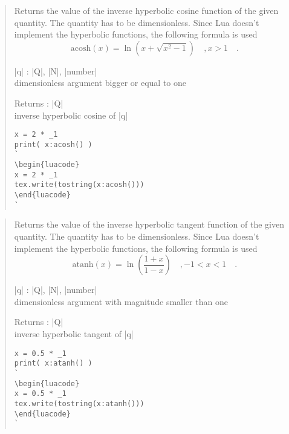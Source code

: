 \documentclass{ltxdoc}
\begin{document}
\begin{quote}
  Returns the value of the inverse hyperbolic cosine function of the given quantity. The quantity has to be dimensionless. Since Lua doesn't implement the hyperbolic functions, the following formula is used 
  $$
    \text{acosh}(x) = \ln\left( x + \sqrt{x^2 - 1} \right)  \quad, x > 1 \quad.
  $$

  \begin{description}
  \item |q| : |Q|, |N|, |number|\\
    dimensionless argument bigger or equal to one

  \item Returns : |Q|\\
    inverse hyperbolic cosine of |q|
  \end{description}


\begin{lstlisting}
x = 2 * _1
print( x:acosh() )
`
\begin{luacode}
x = 2 * _1
tex.write(tostring(x:acosh()))
\end{luacode}
`
\end{lstlisting}

\end{quote}



\begin{quote}
  Returns the value of the inverse hyperbolic tangent function of the given quantity. The quantity has to be dimensionless. Since Lua doesn't implement the hyperbolic functions, the following formula is used 
  $$
    \text{atanh}(x) = \ln\left( \frac{1 + x}{1 - x} \right)  \quad, -1 < x < 1 \quad.
  $$

  \begin{description}
  \item |q| : |Q|, |N|, |number|\\
    dimensionless argument with magnitude smaller than one

  \item Returns : |Q|\\
    inverse hyperbolic tangent of |q|
  \end{description}



\begin{lstlisting}
x = 0.5 * _1
print( x:atanh() )
`
\begin{luacode}
x = 0.5 * _1
tex.write(tostring(x:atanh()))
\end{luacode}
`
\end{lstlisting}

\end{quote}
\end{document}
